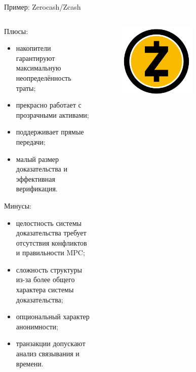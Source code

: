 \documentclass[aspectratio=169]{beamer}
\begin{document}
\begin{frame}{Пример: Zerocash/Zcash}
\begin{columns}
\begin{column}{0.7\textwidth}
Плюсы:
\begin{itemize}
\item накопители гарантируют максимальную неопределённость траты;
\item прекрасно работает с прозрачными активами;
\item поддерживает прямые передачи;
\item малый размер доказательства и эффективная верификация.
\end{itemize}

Минусы:
\begin{itemize}
\item целостность системы доказательства требует отсутствия конфликтов и правильности MPC;
\item сложность структуры из-за более общего характера системы доказательства;
\item опциональный характер анонимности;
\item транзакции допускают анализ связывания и времени.
\end{itemize}
\end{column}
\begin{column}{0.3\textwidth}
\begin{figure}
\includegraphics[width=0.6\textwidth]{zcash.png}
\end{figure}
\end{column}
\end{columns}
\end{frame}
\end{document}
